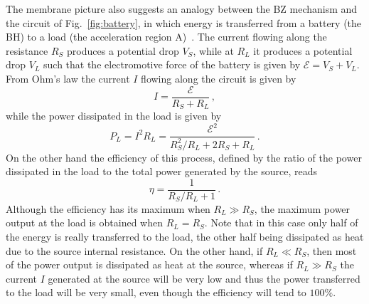 \documentclass[11pt]{article}
\newcommand{\be}{\begin{equation}}
\newcommand{\ee}{\end{equation}}
\numberwithin{equation}{section} %
\begin{document}
The membrane picture also suggests an analogy between the BZ mechanism and the circuit of Fig.~\ref{fig:battery}, in 
which energy is transferred from a battery (the BH) to a load (the acceleration region A)~\cite{MacDonald:1982zz}. The 
current flowing along the resistance $R_S$ produces a potential drop $V_S$, while at $R_L$ it produces a potential drop 
$V_L$ such that the electromotive force of the battery is given by $\mathcal{E}=V_S+V_L$. From Ohm's law the current $I$ 
flowing along the circuit is given by
%
\be
I=\frac{\mathcal{E}}{R_S+R_L}\,,
\ee
% 
while the power dissipated in the load is given by
%
\be
P_L=I^2R_L=\frac{\mathcal{E}^2}{R_S^2/R_L+2R_S+R_L}\,.
\ee
%
On the other hand the efficiency of this process, defined by the ratio of the power dissipated in the load to the total 
power generated by the source, reads
%
\be\label{efficiency_circuit}
\eta=\frac{1}{R_S/R_L+1}\,.
\ee
%
Although the efficiency has its maximum when $R_L\gg R_S$, the maximum power output at the load is obtained when 
$R_L=R_S$. Note that in this case only half of the energy is really transferred to the load, the other half being 
dissipated as heat due to the source internal resistance. On the other hand, if $R_L\ll R_S$, then most of the power 
output is dissipated as heat at the source, whereas if $R_L\gg R_S$ the current $I$ generated at the source will be very 
low and thus the power transferred to the load will be very small, even though the efficiency will tend to $100\%$. 
\end{document}

